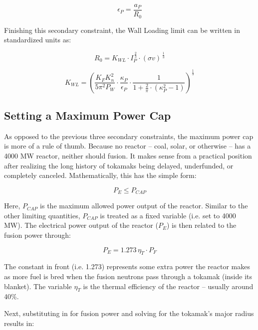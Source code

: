 \begin{equation}
	\epsilon_P = \frac{a_P}{R_0}
\end{equation}

Finishing this secondary constraint, the Wall Loading limit can be written in standardized units as:

\begin{equation}
	R_0 = K_{WL} \cdot I_P^{ \, \frac{2}{3} } \cdot (\sigma v) ^{ \, \frac{1}{3} }
\end{equation}

\begin{equation}
	K_{WL} = \left( \frac{ K_F K_n^2 }{ 5 \pi^2 P_W } \cdot \frac{\kappa_P}{\epsilon_P} \cdot \frac{1}{1 + \frac{2}{\pi} \cdot ( \kappa_P^2 - 1 ) } \right) ^ { \frac{1}{3} }
\end{equation}

\subsection{Setting a Maximum Power Cap}

As opposed to the previous three secondary constraints, the maximum power cap is more of a rule of thumb. Because no reactor -- coal, solar, or otherwise -- has a 4000 MW reactor, neither should fusion. It makes sense from a practical position after realizing the long history of tokamaks being delayed, underfunded, or completely canceled. Mathematically, this has the simple form:

\begin{equation}
	P_E \le P_{CAP}
\end{equation}

Here, $P_{CAP}$ is the maximum allowed power output of the reactor. Similar to the other limiting quantities, $P_{CAP}$ is treated as a fixed variable (i.e. set to 4000 MW). The electrical power output of the reactor ($P_E$) is then related to the fusion power through:

\begin{equation}
	P_E = 1.273 \, \eta_T \cdot P_F
\end{equation}

The constant in front (i.e. 1.273) represents some extra power the reactor makes as more fuel is bred when the fusion neutrons pass through a tokamak (inside its blanket). The variable $\eta_T$ is the thermal efficiency of the reactor -- usually around 40\%.

Next, substituting in for fusion power and solving for the tokamak's major radius results in:

